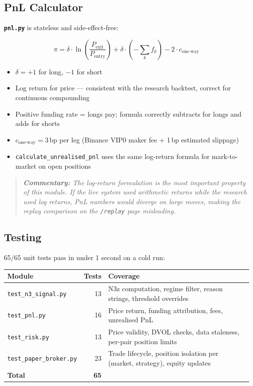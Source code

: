 \documentclass[11pt,a4paper]{article}
\newcommand{\code}[1]{\texttt{#1}}
\newcommand{\comment}[1]{%
  \begin{quote}
    \small\itshape\textbf{Commentary:} #1
  \end{quote}
}
\begin{document}
\subsection{PnL Calculator}

\textbf{\code{pnl.py}} is stateless and side-effect-free:

\begin{equation}
\pi = \delta \cdot \ln\!\left(\frac{P_{\mathrm{exit}}}{P_{\mathrm{entry}}}\right)
   + \delta \cdot \left(-\sum_k f_k\right)
   - 2 \cdot c_{\mathrm{one\text{-}way}}
\end{equation}

\begin{itemize}[noitemsep]
  \item $\delta = +1$ for long, $-1$ for short
  \item Log return for price --- consistent with the research backtest, correct for continuous compounding
  \item Positive funding rate = longs pay; formula correctly subtracts for longs and adds for shorts
  \item $c_{\mathrm{one\text{-}way}} = 3\,\text{bp}$ per leg (Binance VIP0 maker fee + 1\,bp estimated slippage)
  \item \code{calculate\_unrealised\_pnl} uses the same log-return formula for mark-to-market on open positions
\end{itemize}

\comment{The log-return formulation is the most important property of this module. If the live system used arithmetic returns while the research used log returns, PnL numbers would diverge on large moves, making the replay comparison on the \code{/replay} page misleading.}

\subsection{Testing}

65/65 unit tests pass in under 1 second on a cold run:

\begin{center}
\begin{tabular}{@{}lrl@{}}
\toprule
\textbf{Module} & \textbf{Tests} & \textbf{Coverage} \\
\midrule
\code{test\_n3\_signal.py} & 13 & N3z computation, regime filter, reason strings, threshold overrides \\
\code{test\_pnl.py} & 16 & Price return, funding attribution, fees, unrealised PnL \\
\code{test\_risk.py} & 13 & Price validity, DVOL checks, data staleness, per-pair position limits \\
\code{test\_paper\_broker.py} & 23 & Trade lifecycle, position isolation per (market, strategy), equity updates \\
\midrule
\textbf{Total} & \textbf{65} & \\
\bottomrule
\end{tabular}
\end{center}
\end{document}
